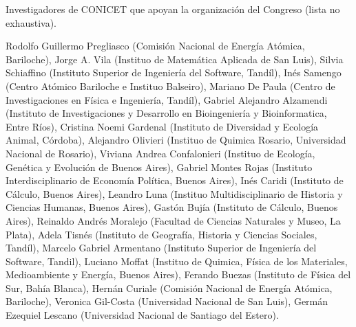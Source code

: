 \documentclass[a4paper,11pt]{article}
\begin{document}
 \vspace{1cm}

Investigadores de CONICET que apoyan la organización del Congreso (lista no exhaustiva).

\vspace{0.3cm}


  \scriptsize
 \noindent  Rodolfo Guillermo Pregliasco (Comisión Nacional de Energía Atómica, Bariloche), Jorge A. Vila (Instituo de Matemática Aplicada de San Luis), Silvia Schiaffino (Instituto Superior de Ingeniería del Software, Tandíl), Inés Samengo (Centro Atómico Bariloche e Instituo Balseiro), Mariano De Paula (Centro de Investigaciones en Física e Ingeniería, Tandíl), Gabriel Alejandro Alzamendi (Instituto de Investigaciones y Desarrollo en Bioingeniería y Bioinformatica, Entre Ríos), Cristina Noemi Gardenal (Instituto de Diversidad y Ecología Animal, Córdoba), Alejandro Olivieri (Instituo de Quimica Rosario, Universidad Nacional de Rosario), Viviana Andrea Confalonieri (Instituo de Ecología, Genética y Evolución de Buenos Aires), Gabriel Montes Rojas (Instituto Interdisciplinario de Economía Política, Buenos Aires), Inés Caridi (Instituto de Cálculo, Buenos Aires), Leandro Luna (Instituo Multidisciplinario de Historia y Ciencias Humanas, Buenos Aires), Gastón Bujía (Instituto de Cálculo, Buenos Aires), Reinaldo Andrés	Moralejo (Facultad de Ciencias Naturales y Museo, La Plata), Adela Tisnés (Instituto de Geografía, Historia y Ciencias Sociales, Tandíl), Marcelo Gabriel	Armentano (Instituto Superior de Ingeniería del Software, Tandil), Luciano Moffat (Instituo de Quimica, Física de los Materiales, Medioambiente y Energía, Buenos Aires), Ferando Buezas (Instituto de Física del Sur, Bahía Blanca), Hernán Curiale (Comisión Nacional de Energía Atómica, Bariloche), Veronica Gil-Costa (Universidad Nacional de San Luis), Germán Ezequiel Lescano (Universidad Nacional de Santiago del Estero).
\end{document}

